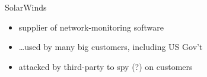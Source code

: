 \begin{frame}{SolarWinds}
    \begin{itemize}
    \item supplier of network-monitoring software
    \item \ldots used by many big customers, including US Gov't
    \vspace{.5cm}
    \item attacked by third-party to spy (?) on customers
    \end{itemize}
\end{frame}

